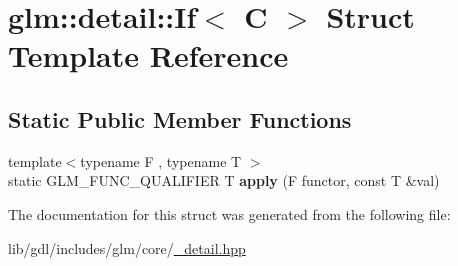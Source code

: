 \hypertarget{structglm_1_1detail_1_1_if}{}\section{glm\+:\+:detail\+:\+:If$<$ C $>$ Struct Template Reference}
\label{structglm_1_1detail_1_1_if}
\subsection*{Static Public Member Functions}
\begin{DoxyCompactItemize}
\item 
\hypertarget{structglm_1_1detail_1_1_if_ab66c77bac87f7ffe4aa6bb761b165746}{}{\footnotesize template$<$typename F , typename T $>$ }\\static G\+L\+M\+\_\+\+F\+U\+N\+C\+\_\+\+Q\+U\+A\+L\+I\+F\+I\+E\+R T {\bfseries apply} (F functor, const T \&val)\label{structglm_1_1detail_1_1_if_ab66c77bac87f7ffe4aa6bb761b165746}

\end{DoxyCompactItemize}


The documentation for this struct was generated from the following file\+:\begin{DoxyCompactItemize}
\item 
lib/gdl/includes/glm/core/\hyperlink{__detail_8hpp}{\+\_\+detail.\+hpp}\end{DoxyCompactItemize}
